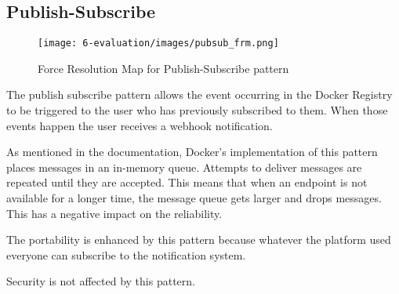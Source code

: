 \subsection{Publish-Subscribe}
\begin{figure}[H]
\centering
\texttt{[image: 6-evaluation/images/pubsub\_frm.png]}
\caption{Force Resolution Map for Publish-Subscribe pattern}
\label{fig:pubsub-frm}
\end{figure}
The publish subscribe pattern allows the event occurring in the Docker Registry to be triggered to the user who has previously subscribed to them. When those events happen the user receives a webhook notification.

As mentioned in the documentation\cite{docknotif}, Docker's implementation of this pattern places messages in an in-memory queue. Attempts to deliver messages are repeated until they are accepted. This means that when an endpoint is not available for a longer time, the message queue gets larger and drops messages. This has a negative impact on the reliability.

The portability is enhanced by this pattern because whatever the platform used everyone can subscribe to the notification system.

Security is not affected by this pattern.


